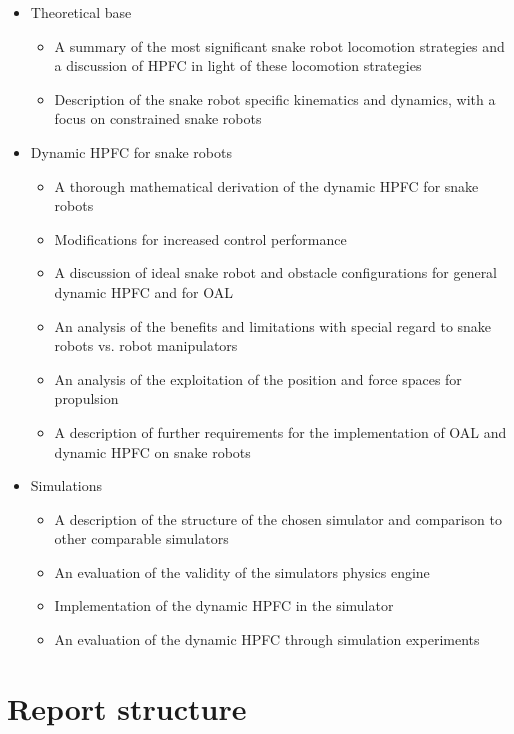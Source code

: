 \begin{itemize}
    \item Theoretical base
    \begin{itemize}
        \item A summary of the most significant snake robot locomotion strategies and a discussion of HPFC in light of these locomotion strategies
        \item Description of the snake robot specific kinematics and dynamics, with a focus on constrained snake robots
    \end{itemize}
    
    \item Dynamic HPFC for snake robots
    \begin{itemize}
        \item A thorough mathematical derivation of the dynamic HPFC for snake robots
        \item Modifications for increased control performance
        \item A discussion of ideal snake robot and obstacle configurations for general dynamic HPFC and for OAL
        \item An analysis of the benefits and limitations with special regard to snake robots vs. robot manipulators
        \item An analysis of the exploitation of the position and force spaces for propulsion
        \item A description of further requirements for the implementation of OAL and dynamic HPFC on snake robots 
    \end{itemize}
    
    \item Simulations
    \begin{itemize}
        \item A description of the structure of the chosen simulator and comparison to other comparable simulators
        \item An evaluation of the validity of the simulators physics engine
        \item Implementation of the dynamic HPFC in the simulator
        \item An evaluation of the dynamic HPFC through simulation experiments
    \end{itemize}

\end{itemize}


\section{Report structure}

